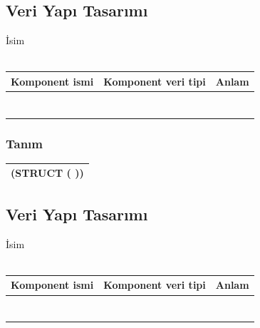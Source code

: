 \documentclass[12pt, a4paper]{article}
\newcommand\fillin[1][3cm]{\makebox[#1]{\dotfill}}
\begin{document}
\subsection*{Veri Yapı Tasarımı}
İsim \fillin[5cm]\\
\vspace{0.5cm}\\
\begin{tabular}{| p{4cm} | p{4cm} | p{8cm} |  }
\hline			
Komponent ismi&Komponent veri tipi&Anlam\\
\hline
& & \\[10ex]
\hline  
& & \\[10ex]
\hline  
& & \\[10ex]
\hline  
& & \\[10ex]
\hline  
& & \\[10ex]
\hline  
& & \\[10ex]
\hline  
& & \\[10ex]
\hline  
\end{tabular}

\subsubsection*{Tanım}
\begin{tabular}{| p{17cm} |  }
\hline			
\vspace{0.5cm}
(STRUCT \fillin[3cm] (\fillin[10cm] ))\\[10ex]
\hline
\end{tabular}






\newpage
\subsection*{Veri Yapı Tasarımı}
İsim \fillin[5cm]\\
\vspace{0.5cm}\\
\begin{tabular}{| p{4cm} | p{4cm} | p{8cm} |  }
\hline			
Komponent ismi&Komponent veri tipi&Anlam\\
\hline
& & \\[10ex]
\hline  
& & \\[10ex]
\hline  
& & \\[10ex]
\hline  
& & \\[10ex]
\hline  
& & \\[10ex]
\hline  
& & \\[10ex]
\hline  
& & \\[10ex]
\hline  
\end{tabular}
\end{document}
